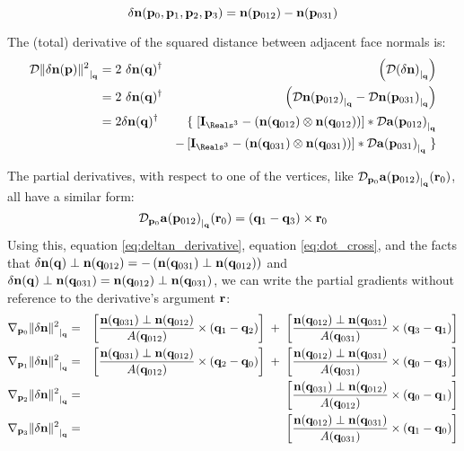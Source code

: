 \begin{equation}
\label{eq:deltan}
{\mathbf \dn} (\p_0, \p_1, \p_2, \p_3)
=
\n (\p_{012}) - \n (\p_{031})
\end{equation}

The (total) derivative of the squared distance between adjacent face normals is:
\begin{eqnarray}
\Db{\|\dn(\p)\|^2}{\q}
& =
2 \ \dn ( \q )^\dagger &
\left( \Db{ ( \dn ) }{\q} \right)
\\
& =
2 \ \dn(\q)^\dagger &
\left( \Db{\n(\p_{012})}{\q} - \Db{\n(\p_{031})}{\q} \right)
\nonumber \\
& =
2 \dn(\q)^\dagger &
\{ \; \left[ \I_{\Reals^3} - \left( \n( \q_{012} ) \otimes \n( \q_{012} ) \right)
\right]
\ast \Db{\a ( \p_{012} ) }{\q}
\nonumber \\
\label{eq:deltan_derivative}
&
& - \left[ \I_{\Reals^3} - \left( \n( \q_{031} ) \otimes \n ( \q_{031} ) \right)
\right]
\ast \Db{\a ( \p_{031} ) }{\q}
\; \}
\nonumber
\end{eqnarray}

The partial derivatives, with respect to one of the vertices,
like ${\mathcal{D}_{{\mathbf p}_0}{{{\mathbf a} ( {\mathbf p}_{012} ) }}_{\mid_{{\mathbf q}}}({{{\mathbf r}_0}})}$,
all have a similar form:
\begin{equation}
{\mathcal{D}_{{\mathbf p}_0}{{{\mathbf a}( {\mathbf p}_{012} ) }}_{\mid_{{\mathbf q}}}({{{\mathbf r}_0}})}  = ({\mathbf q}_1 - {\mathbf q}_3) \times {\mathbf r}_0
\end{equation}
Using this, equation \ref{eq:deltan_derivative}, equation \ref{eq:dot_cross},
and the facts that
${\mathbf \delta {\mathbf n}}({\mathbf q})  \perp  {\mathbf n}({\mathbf q}_{012}) = - \left( {\mathbf n}({\mathbf q}_{031})  \perp  {\mathbf n}({\mathbf q}_{012}) \right)$
and
${\mathbf \delta {\mathbf n}}({\mathbf q})  \perp  {\mathbf n}({\mathbf q}_{031}) = {\mathbf n}({\mathbf q}_{012})  \perp  {\mathbf n}({\mathbf q}_{031})$,
we can write the partial gradients without reference to the
derivative's argument ${\mathbf r}$:
\begin{eqnarray}
\label{eq:normal-difference-gradient}
\Gc{\p_0}{\|\dn\|^2}{\q}
& = &
\left[
{{ \n(\q_{031})  \perp  \n(\q_{012}) }
\over {A(\q_{012})}}
\times (\q_1 - \q_2)
\right]
\; + \;
\left[
{{ \n(\q_{012})  \perp  \n(\q_{031}) }
\over {A(\q_{031})}}
\times (\q_3 - \q_1)
\right]
\\
\Gc{\p_1}{\|\dn\|^2}{\q}
& = &
\left[
{{ \n(\q_{031})  \perp  \n(\q_{012}) }
\over {A(\q_{012})}}
\times (\q_2 - \q_0)
\right]
\; + \;
\left[
{{ \n(\q_{012})  \perp  \n(\q_{031}) }
\over {A(\q_{031})}}
\times (\q_0 - \q_3)
\right]
\nonumber
\\
\Gc{\p_2}{\|\dn\|^2}{\q}
& = &
\left[
{{ \n(\q_{031})  \perp  \n(\q_{012}) }
\over {A(\q_{012})}}
\times (\q_0 - \q_1)
\right]
\nonumber
\\
\Gc{\p_3}{\|\dn\|^2}{\q}
& = &
\left[
{{ \n(\q_{012})  \perp  \n(\q_{031}) }
\over {A(\q_{031})}}
\times (\q_1 - \q_0)
\right]
\nonumber
\end{eqnarray}

